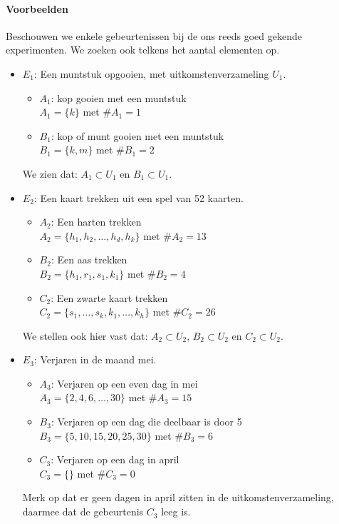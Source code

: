 \documentclass[12pt,a4paper,twoside]{article}
\begin{document}
\paragraph*{Voorbeelden} Beschouwen we enkele gebeurtenissen bij de ons reeds goed gekende experimenten.
We zoeken ook telkens het aantal elementen op.
\begin{itemize}
  \item $E_1$: Een muntstuk opgooien, met uitkomstenverzameling $U_1$.
  \begin{itemize}
    \item $A_1$: kop gooien met een muntstuk\\
    $A_1=\{k\}$ met $\#A_1=1$
    \item $B_1$: kop of munt gooien met een muntstuk\\
    $B_1=\{k, m\}$ met $\#B_1=2$
  \end{itemize}
  We zien dat: $A_1\subset U_1$ en $B_1\subset U_1$.
  \item $E_2$: Een kaart trekken uit een spel van 52 kaarten.
  \begin{itemize}
    \item $A_2$: Een harten trekken\\
    $A_2=\{h_1, h_2, \ldots, h_d, h_k\}$ met $\#A_2=13$
    \item $B_2$: Een aas trekken\\
    $B_2=\{h_1, r_1, s_1, k_1\}$ met $\#B_2=4$
    \item $C_2$: Een zwarte kaart trekken\\
    $C_2=\{s_1, \ldots, s_k, k_1, \ldots, k_h\}$ met $\#C_2=26$
  \end{itemize}
  We stellen ook hier vast dat: $A_2\subset U_2$, $B_2\subset U_2$ en $C_2\subset U_2$.
  \item $E_3$: Verjaren in de maand mei.
  \begin{itemize}
    \item $A_3$: Verjaren op een even dag in mei\\
    $A_3=\{2,4,6,\ldots,30\}$ met $\#A_3=15$
    \item $B_3$: Verjaren op een dag die deelbaar is door 5\\
    $B_3=\{5,10,15,20,25,30\}$ met $\#B_3=6$
    \item $C_3$: Verjaren op een dag in april\\
    $C_3=\{\}$ met $\#C_3=0$
  \end{itemize}
  Merk op dat er geen dagen in april zitten in de uitkomstenverzameling, daarmee dat de gebeurtenis $C_3$ leeg is.
\end{itemize}
\end{document}

